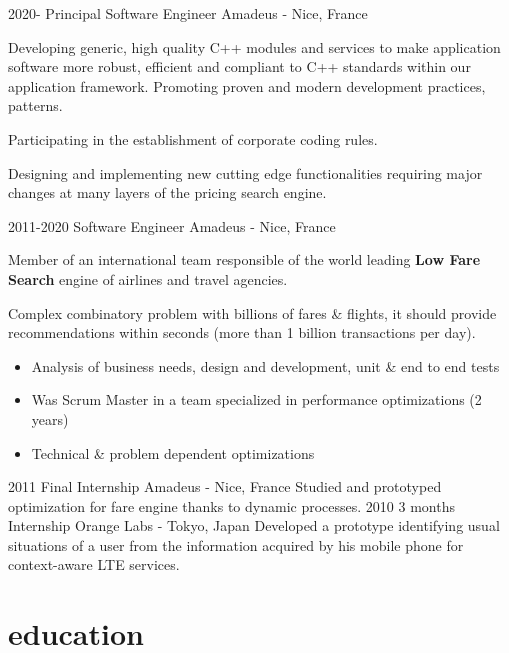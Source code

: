 \documentclass[]{twentysecondcv}
\begin{document}
\begin{twenty}
  \twentyitem
    {2020-}
    {Principal Software Engineer}
    {Amadeus - Nice, France}
    {Developing generic, high quality C++ modules and services to make application software more robust, efficient and compliant to C++ standards within our application framework.
Promoting proven and modern development practices, patterns.

Participating in the establishment of corporate coding rules.

Designing and implementing new cutting edge functionalities requiring major changes at many layers of the pricing search engine.
}
  \twentyitem
    {2011-2020}
    {Software Engineer}
    {Amadeus - Nice, France}
    {Member of an international team responsible of the world leading \textbf{Low Fare Search} engine of airlines and travel agencies. 
    
Complex combinatory problem with billions of fares \& flights, it should provide recommendations within seconds (more than 1 billion transactions per day).  

\begin{itemize}
  \item Analysis of business needs, design and development, unit \& end to end tests
  \item Was Scrum Master in a team specialized in performance optimizations (2 years)
  \item Technical \& problem dependent optimizations
\end{itemize}
}
  \twentyitem
    {2011}
    {Final Internship}
    {Amadeus - Nice, France}
    {Studied and prototyped optimization for fare engine thanks to dynamic processes.}
  \twentyitem
    {2010}
    {3 months Internship}
    {Orange Labs - Tokyo, Japan}
    {Developed a prototype identifying usual situations of a user from the information acquired by his mobile phone for context-aware LTE services.}

\end{twenty}

\section{education}
\end{document}
